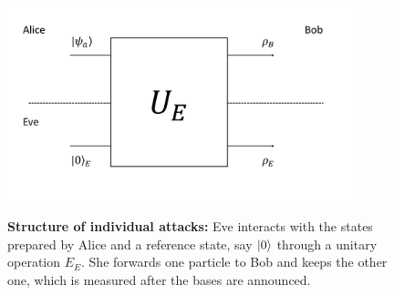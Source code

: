\documentclass[a4paper]{article}
\begin{document}
\begin{figure}
\begin{center}
  \includegraphics[width=10cm]{Cloning_Attack.pdf}\\
  \caption{\textbf{Structure of individual attacks:} Eve interacts with the states prepared by Alice and a reference state, say $|0\rangle$ through a unitary operation $E_E$. She forwards one particle to Bob and keeps the other one, which is measured after the bases are announced.}\label{indattacks}
\end{center}
\end{figure}
\end{document}
